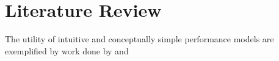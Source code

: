 \section{Literature Review}

The utility of intuitive and conceptually simple performance models are exemplified by work done by  and 
